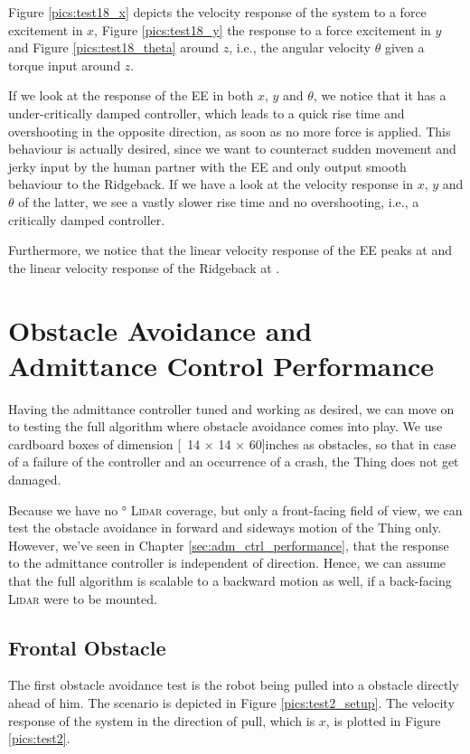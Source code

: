 Figure \ref{pics:test18_x} depicts the velocity response of the system to a force excitement in $x$, Figure \ref{pics:test18_y} the response to a force excitement in $y$ and Figure \ref{pics:test18_theta} around $z$, i.e., the angular velocity $\theta$ given a torque input around $z$.

If we look at the response of the EE in both $x$, $y$ and $\theta$, we notice that it has a under-critically damped controller, which leads to a quick rise time and overshooting in the opposite direction, as soon as no more force is applied. This behaviour is actually desired, since we want to counteract sudden movement and jerky input by the human partner with the EE and only output smooth behaviour to the Ridgeback. If we have a look at the velocity response in $x$, $y$ and $\theta$ of the latter, we see a vastly slower rise time and no overshooting, i.e., a critically damped controller.

Furthermore, we notice that the linear velocity response of the EE peaks at  and the linear velocity response of the Ridgeback at .

\section{Obstacle Avoidance and Admittance Control Performance}
Having the admittance controller tuned and working as desired, we can move on to testing the full algorithm where obstacle avoidance comes into play. We use cardboard boxes of dimension \unit[14 $\times$ 14 $\times$ 60]{inches} as obstacles, so that in case of a failure of the controller and an occurrence of a crash, the Thing does not get damaged.

Because we have no \unit[360]{\degree} \textsc{Lidar} coverage, but only a front-facing field of view, we can test the obstacle avoidance in forward and sideways motion of the Thing only. However, we've seen in Chapter \ref{sec:adm_ctrl_performance}, that the response to the admittance controller is independent of direction. Hence, we can assume that the full algorithm is scalable to a backward motion as well, if a back-facing \textsc{Lidar} were to be mounted.

\subsection{Frontal Obstacle}
The first obstacle avoidance test is the robot being pulled into a obstacle directly ahead of him. The scenario is depicted in Figure \ref{pics:test2_setup}. The velocity response of the system in the direction of pull, which is $x$, is plotted in Figure \ref{pics:test2}.

